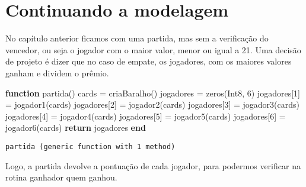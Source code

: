 \documentclass[
  letterpaper,
  DIV=11,
  numbers=noendperiod]{scrreprt}
\newenvironment{Shaded}{\begin{snugshade}}{\end{snugshade}}
\newcommand{\ControlFlowTok}[1]{\textcolor[rgb]{0.00,0.23,0.31}{\textbf{#1}}}
\newcommand{\DataTypeTok}[1]{\textcolor[rgb]{0.68,0.00,0.00}{#1}}
\newcommand{\FloatTok}[1]{\textcolor[rgb]{0.68,0.00,0.00}{#1}}
\newcommand{\FunctionTok}[1]{\textcolor[rgb]{0.28,0.35,0.67}{#1}}
\newcommand{\KeywordTok}[1]{\textcolor[rgb]{0.00,0.23,0.31}{\textbf{#1}}}
\newcommand{\NormalTok}[1]{\textcolor[rgb]{0.00,0.23,0.31}{#1}}
\newcommand{\OperatorTok}[1]{\textcolor[rgb]{0.37,0.37,0.37}{#1}}
\begin{document}

\chapter{Continuando a modelagem}\label{continuando-a-modelagem}

No capítulo anterior ficamos com uma partida, mas sem a verificação do
vencedor, ou seja o jogador com o maior valor, menor ou igual a 21. Uma
decisão de projeto é dizer que no caso de empate, os jogadores, com os
maiores valores ganham e dividem o prêmio.

\begin{Shaded}
\begin{Highlighting}[]
\KeywordTok{function} \FunctionTok{partida}\NormalTok{()}
\NormalTok{  cards }\OperatorTok{=} \FunctionTok{criaBaralho}\NormalTok{()}
\NormalTok{  jogadores }\OperatorTok{=} \FunctionTok{zeros}\NormalTok{(}\DataTypeTok{Int8}\NormalTok{, }\FloatTok{6}\NormalTok{)}
\NormalTok{  jogadores[}\FloatTok{1}\NormalTok{] }\OperatorTok{=} \FunctionTok{jogador1}\NormalTok{(cards)}
\NormalTok{  jogadores[}\FloatTok{2}\NormalTok{] }\OperatorTok{=} \FunctionTok{jogador2}\NormalTok{(cards)}
\NormalTok{  jogadores[}\FloatTok{3}\NormalTok{] }\OperatorTok{=} \FunctionTok{jogador3}\NormalTok{(cards)}
\NormalTok{  jogadores[}\FloatTok{4}\NormalTok{] }\OperatorTok{=} \FunctionTok{jogador4}\NormalTok{(cards)}
\NormalTok{  jogadores[}\FloatTok{5}\NormalTok{] }\OperatorTok{=} \FunctionTok{jogador5}\NormalTok{(cards)}
\NormalTok{  jogadores[}\FloatTok{6}\NormalTok{] }\OperatorTok{=} \FunctionTok{jogador6}\NormalTok{(cards)}
  \ControlFlowTok{return}\NormalTok{ jogadores}
\KeywordTok{end}
\end{Highlighting}
\end{Shaded}

\begin{verbatim}
partida (generic function with 1 method)
\end{verbatim}

Logo, a partida devolve a pontuação de cada jogador, para podermos
verificar na rotina ganhador quem ganhou.
\end{document}
